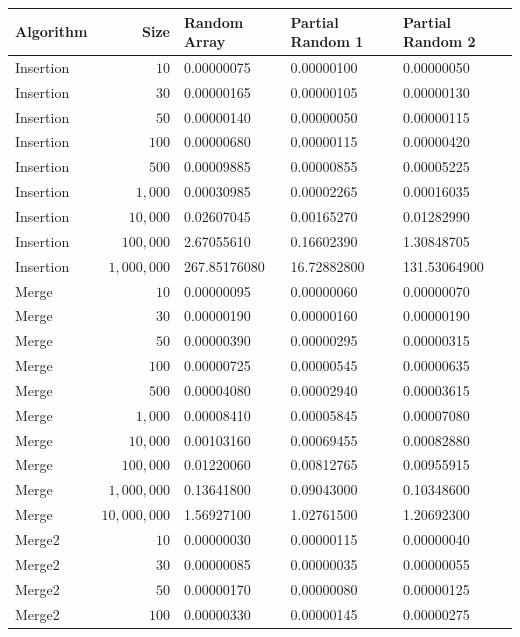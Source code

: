 \renewcommand{\arraystretch}{1}
\begin{table}[h!]
\centering
\scriptsize
\begin{tabularx}{\textwidth}{l r X X X}
\toprule
\textbf{Algorithm} & \textbf{Size} & \textbf{Random Array} & \textbf{Partial Random 1} & \textbf{Partial Random 2} \\
\midrule
Insertion & $10$ & 0.00000075 & 0.00000100 & 0.00000050 \\
Insertion & $30$ & 0.00000165 & 0.00000105 & 0.00000130 \\
Insertion & $50$ & 0.00000140 & 0.00000050 & 0.00000115 \\
Insertion & $100$ & 0.00000680 & 0.00000115 & 0.00000420 \\
Insertion & $500$ & 0.00009885 & 0.00000855 & 0.00005225 \\
Insertion & $1{,}000$ & 0.00030985 & 0.00002265 & 0.00016035 \\
Insertion & $10{,}000$ & 0.02607045 & 0.00165270 & 0.01282990 \\
Insertion & $100{,}000$ & 2.67055610 & 0.16602390 & 1.30848705 \\
Insertion & $1{,}000{,}000$ & 267.85176080 & 16.72882800 & 131.53064900 \\
\midrule
Merge & $10$ & 0.00000095 & 0.00000060 & 0.00000070 \\
Merge & $30$ & 0.00000190 & 0.00000160 & 0.00000190 \\
Merge & $50$ & 0.00000390 & 0.00000295 & 0.00000315 \\
Merge & $100$ & 0.00000725 & 0.00000545 & 0.00000635 \\
Merge & $500$ & 0.00004080 & 0.00002940 & 0.00003615 \\
Merge & $1{,}000$ & 0.00008410 & 0.00005845 & 0.00007080 \\
Merge & $10{,}000$ & 0.00103160 & 0.00069455 & 0.00082880 \\
Merge & $100{,}000$ & 0.01220060 & 0.00812765 & 0.00955915 \\
Merge & $1{,}000{,}000$ & 0.13641800 & 0.09043000 & 0.10348600 \\
Merge & $10{,}000{,}000$ & 1.56927100 & 1.02761500 & 1.20692300 \\
\midrule
Merge2 & $10$ & 0.00000030 & 0.00000115 & 0.00000040 \\
Merge2 & $30$ & 0.00000085 & 0.00000035 & 0.00000055 \\
Merge2 & $50$ & 0.00000170 & 0.00000080 & 0.00000125 \\
Merge2 & $100$ & 0.00000330 & 0.00000145 & 0.00000275 \\

\end{tabularx}
\end{table}
